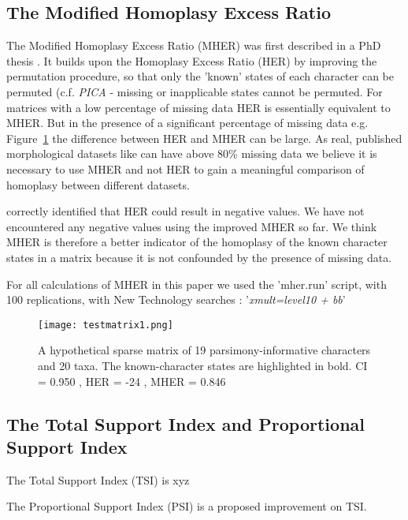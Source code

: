 \documentclass[fleqn,10pt]{wlpeerj}
\begin{document}
\subsection{The Modified Homoplasy Excess Ratio}

The Modified Homoplasy Excess Ratio (MHER) was first described in a PhD thesis \cite{Mounce2013}. It builds upon the Homoplasy Excess Ratio \cite{Archie1989} (HER) by improving the permutation procedure, so that only the 'known' states of each character can be permuted (c.f. \emph{PICA} \cite{Wilkinson2001}  - missing or inapplicable states cannot be permuted. For matrices with a low percentage of missing data HER is essentially equivalent to MHER. But in the presence of a significant percentage of missing data e.g. Figure~\ref{fig:testmatrix1} the difference between HER and MHER can be large. As real, published morphological datasets like \cite{Kurochkin1996} can have above 80\% missing data we believe it is necessary to use MHER and not HER to gain a meaningful comparison of homoplasy between different datasets.

\cite{Farris1991} correctly identified that HER could result in negative values. We have not encountered any negative values using the improved MHER so far. We think MHER is therefore a better indicator of the homoplasy of the known character states in a matrix because it is not confounded by the presence of missing data.

For all calculations of MHER in this paper we used the 'mher.run' script, with 100 replications, with New Technology searches \cite{Goloboff1999,Nixon1999}: '\emph{xmult=level10 + bb}'


\begin{figure}
\centering
\texttt{[image: testmatrix1.png]}
\caption{\label{fig:testmatrix1}A hypothetical sparse matrix of 19 parsimony-informative characters and 20 taxa. The known-character states are highlighted in bold. CI = 0.950 , HER = -24 , MHER = 0.846 }
\end{figure}


\subsection{The Total Support Index and Proportional Support Index}

The Total Support Index \cite{Bremer1994} (TSI) is xyz

The Proportional Support Index \cite{Lee1999} (PSI) is a proposed improvement on TSI.
\end{document}

